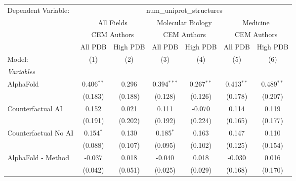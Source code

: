 \begingroup
\centering
\begin{tabular}{lcccccc}
   \tabularnewline \midrule \midrule
   Dependent Variable: & \multicolumn{6}{c}{num\_uniprot\_structures}\\
 & \multicolumn{2}{c}{All Fields} & \multicolumn{2}{c}{Molecular Biology} & \multicolumn{2}{c}{Medicine} \\
\cmidrule(lr){2-3} \cmidrule(lr){4-5} \cmidrule(lr){6-7}
 & \multicolumn{2}{c}{CEM Authors} & \multicolumn{2}{c}{CEM Authors} & \multicolumn{2}{c}{CEM Authors} \\
\cmidrule(lr){2-3} \cmidrule(lr){4-5} \cmidrule(lr){6-7}
 & \multicolumn{1}{c}{All PDB} & \multicolumn{1}{c}{High PDB} & \multicolumn{1}{c}{All PDB} & \multicolumn{1}{c}{High PDB} & \multicolumn{1}{c}{All PDB} & \multicolumn{1}{c}{High PDB} \\
\cmidrule(lr){2-2} \cmidrule(lr){3-3} \cmidrule(lr){4-4} \cmidrule(lr){5-5} \cmidrule(lr){6-6} \cmidrule(lr){7-7}
   Model:                                                     & (1)          & (2)     & (3)           & (4)          & (5)           & (6)\\  
   \midrule
   \emph{Variables}\\
   AlphaFold                                                  & 0.406$^{**}$ & 0.296   & 0.394$^{***}$ & 0.267$^{**}$ & 0.413$^{**}$  & 0.489$^{**}$\\   
                                                              & (0.183)      & (0.188) & (0.128)       & (0.126)      & (0.178)       & (0.207)\\   
   Counterfactual AI                                          & 0.152        & 0.021   & 0.111         & -0.070       & 0.114         & 0.119\\   
                                                              & (0.191)      & (0.202) & (0.192)       & (0.224)      & (0.165)       & (0.177)\\   
   Counterfactual No AI                                       & 0.154$^{*}$  & 0.130   & 0.185$^{*}$   & 0.163        & 0.147         & 0.110\\   
                                                              & (0.088)      & (0.107) & (0.095)       & (0.102)      & (0.125)       & (0.154)\\   
   AlphaFold - Method                                         & -0.037       & 0.018   & -0.040        & 0.018        & -0.030        & 0.016\\   
                                                              & (0.042)      & (0.051) & (0.025)       & (0.029)      & (0.168)       & (0.170)\\   

\end{tabular}
